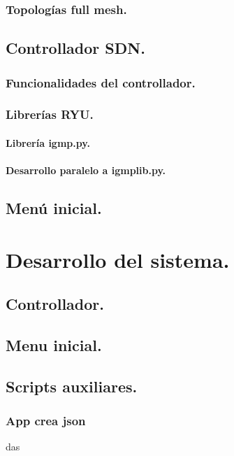 \documentclass[12pt,a4paper,oneside]{book}
\begin{document}
\subsection{Topologías full mesh.}
\label{topos_full_mesh}


\section{Controllador SDN.}

\subsection{Funcionalidades del controllador.}

\subsection{Librerías RYU.}

\subsubsection{Librería igmp.py.}

\subsubsection{Desarrollo paralelo a igmplib.py.}

\section{Menú inicial.}


\chapter{Desarrollo del sistema.}

\section{Controllador.}

\section{Menu inicial.}

\section{Scripts auxiliares.}

\subsection{App crea json}
das
\end{document}
